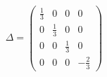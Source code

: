 \begin{equation}
\Delta = \left(
\begin{array}{cccc}
\frac{1}{3} & 0 & 0 & 0 \\
0 & \frac{1}{3} & 0 & 0 \\
0 & 0 & \frac{1}{3} & 0 \\
0 & 0 & 0 & -\frac{2}{3}
\end{array}
\right)
\end{equation}

